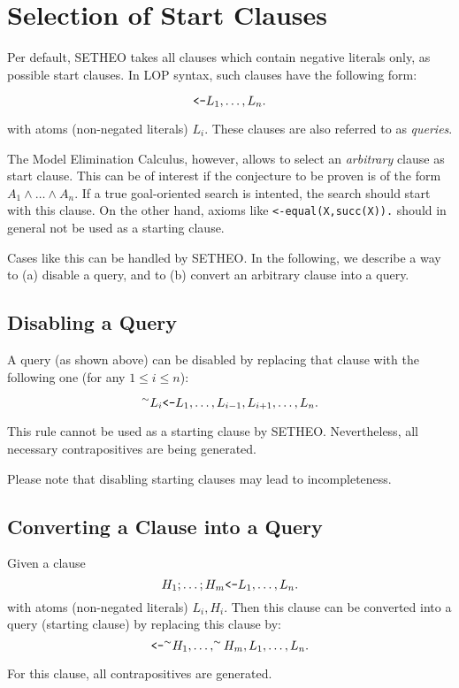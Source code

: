 %
\section{Selection of Start Clauses}
\label{sec:startclauses}

Per default, SETHEO takes all clauses which contain negative
literals only, as possible start clauses.
In LOP syntax, such clauses have the following form:

\[ \mbox{\tt <-} L_1, \ldots, L_n. \]

with atoms (non-negated literals) $L_i$.
These clauses are also referred to as {\em queries}.

The Model Elimination Calculus, however, allows to select
an {\em arbitrary\/} clause as start clause.
This can be of interest if the conjecture to be proven is of the form
$A_1 \wedge \ldots \wedge A_n$.
If a true goal-oriented search is intented,
the search should start with this clause.
On the other hand, axioms like {\tt <-equal(X,succ(X)).} should in general
not be used as a starting clause.

Cases like this can be handled by SETHEO.
In the following, we describe a way to (a) disable a query, and to
(b) convert an arbitrary clause into a query.

\subsection{Disabling a Query}
A query (as shown above) can be disabled by replacing that clause
with the following one (for any $1 \leq i \leq n$):

\[ ^\sim L_i \mbox{\tt <-} L_1, \ldots, L_{i-1},L_{i+1},\ldots,L_n. \]

This rule cannot be used as a starting clause by SETHEO. Nevertheless,
all necessary contrapositives are being generated.

Please note that disabling starting clauses may lead to incompleteness.

\subsection{Converting a Clause into a Query}
Given a clause
\[ H_1 ; \ldots ; H_m \mbox{\tt <-} L_1, \ldots,L_n. \]
with atoms (non-negated literals) $L_i,H_i$.
Then this clause can be converted into a query (starting clause)
by replacing this clause by:
\[ \mbox{\tt <-}
^\sim H_1, \ldots , ^\sim H_m, L_1, \ldots,L_n. \]

For this clause, all contrapositives are generated.
